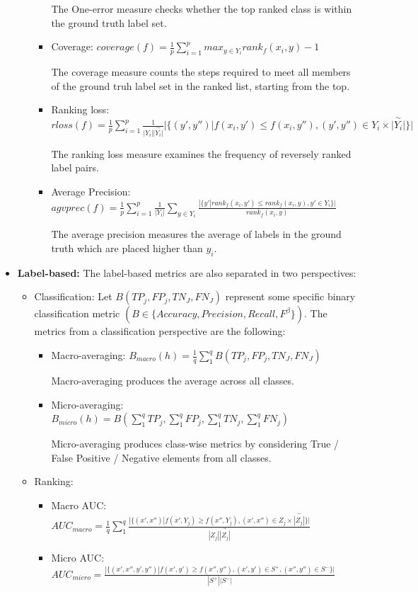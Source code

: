\documentclass[12pt]{report}
\begin{document}
\begin{itemize}
\begin{itemize}
\begin{itemize}
          The One-error measure checks whether the top ranked class is within
          the ground truth label set.
				\item Coverage:  $coverage(f) = \frac{1}{p} \sum_{i=1}^{p} max_{y \in Y_i} rank_f(x_i,y) - 1$

          The coverage measure counts the steps required to meet all members of
          the ground truh label set in the ranked list, starting from the top.
				\item Ranking loss: $rloss(f) = \frac{1}{p} \sum_{i=1}^{p} \frac{1}{|Y_i| {\overset{\sim}{|Y_i|}}} |\{(y', y'') | f(x_i,y') \leq f(x_i,y''), (y', y'') \in Y_i \times {\overset{\sim}{|Y_i|}} \}| $ 

          The ranking loss measure examines the frequency of reversely ranked
          label pairs.
				\item Average Precision:  $agvprec(f) = \frac{1}{p} \sum_{i=1}^{p} \frac{1}{|Y_i|} \sum_{y \in Y_i} \frac{|\{y' | rank_f(x_i,y') \leq rank_f(x_i,y), y' \in Y_i\}|}{rank_f(x_i,y)}$

          The average precision measures the average of labels in the ground
          truth which are placed higher than $y_i$.
			\end{itemize}
		\end{itemize}
  \item \textbf{Label-based: }
		The label-based metrics are also separated in two perspectives:
		\begin{itemize}
			\item Classification: Let $B(TP_j, FP_j, TN_J, FN_J)$ represent some
        specific binary classification metric $(B \in \{Accuracy, Precision,
        Recall, F^ \beta \})$. The metrics from a classification perspective are the following:
			\begin{itemize}
				\item Macro-averaging: $B_{macro}(h) = \frac{1}{q} \sum_{1}^{q} B(TP_j, FP_j, TN_J, FN_J)$

          Macro-averaging produces the average across all classes.
				\item Micro-averaging: $B_{micro}(h) = B(\sum_{1}^{q}TP_j, \sum_{1}^{q}FP_j, \sum_{1}^{q}TN_j, \sum_{1}^{q}FN_j)$

          Micro-averaging produces class-wise metrics by considering True /
          False Positive / Negative elements from all classes.
			\end{itemize}
			\item Ranking:
			\begin{itemize}
				\item Macro AUC: $AUC_{macro} = \frac{1}{q} \sum_{1}^{q} \frac{|\{(x', x'') | f(x',Y_j) \geq f(x'',Y_j), (x',x'') \in Z_j \times \overset{\sim}{|Z_j|} \}|}{|Z_j|{\overset{\sim}{|Z_j|}}}$
				\item Micro AUC: $AUC_{micro} = \frac{|\{(x',x'',y',y'') | f(x',y') \geq f(x'',y''), (x',y') \in S^+, (x'',y'') \in S^- \}|}{|S^+||S^-|}$


\end{itemize}
\end{itemize}
\end{itemize}
\end{document}
